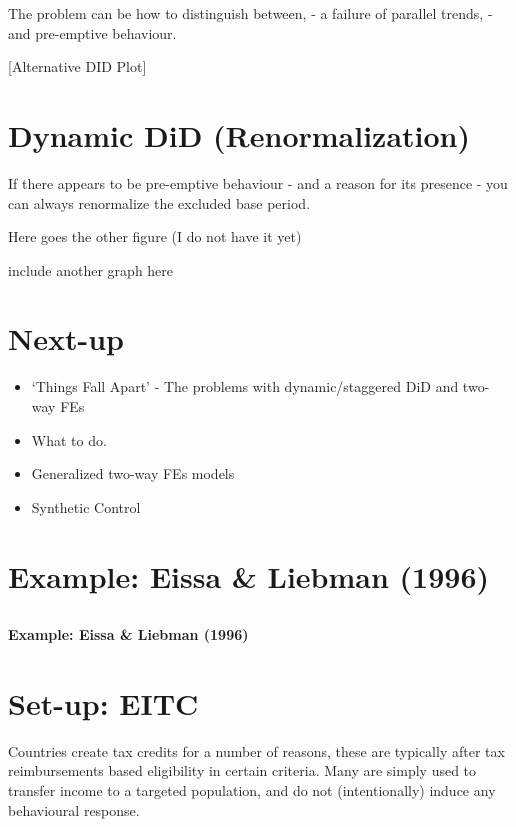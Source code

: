 \documentclass[
  letterpaper,
  DIV=11,
  numbers=noendperiod]{scrreprt}
\providecommand{\tightlist}{%
  \setlength{\itemsep}{0pt}\setlength{\parskip}{0pt}}\usepackage{longtable,booktabs,array}
\theoremstyle{definition}
\theoremstyle{remark}
\begin{document}
The problem can be how to distinguish between, - a failure of parallel
trends, - and pre-emptive behaviour.

{[}Alternative DID Plot{]}

\hypertarget{dynamic-did-renormalization}{%
\section{Dynamic DiD
(Renormalization)}\label{dynamic-did-renormalization}}

If there appears to be pre-emptive behaviour - and a reason for its
presence - you can always renormalize the excluded base period.

Here goes the other figure (I do not have it yet)

include another graph here

\hypertarget{next-up-1}{%
\section{Next-up}\label{next-up-1}}

\begin{itemize}
\tightlist
\item
  `Things Fall Apart' - The problems with dynamic/staggered DiD and
  two-way FEs
\item
  What to do.
\item
  Generalized two-way FEs models
\item
  Synthetic Control
\end{itemize}

\hypertarget{example-eissa-liebman-1996}{%
\section{Example: Eissa \& Liebman
(1996)}\label{example-eissa-liebman-1996}}

\hypertarget{section}{%
\subsection{}\label{section}}

\textbf{Example: Eissa \& Liebman (1996)}

\hypertarget{set-up-eitc}{%
\section{Set-up: EITC}\label{set-up-eitc}}

Countries create tax credits for a number of reasons, these are
typically after tax reimbursements based eligibility in certain
criteria. Many are simply used to transfer income to a targeted
population, and do not (intentionally) induce any behavioural response.
\end{document}
